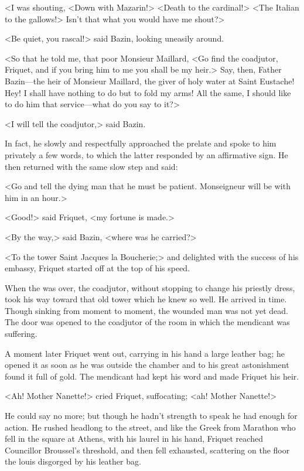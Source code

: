 <I was shouting, <Down with Mazarin!> <Death to the cardinal!> <The Italian to the gallows!> Isn't that what you would have me shout?>

<Be quiet, you rascal!> said Bazin, looking uneasily around.

<So that he told me, that poor Monsieur Maillard, <Go find the coadjutor, Friquet, and if you bring him to me you shall be my heir.> Say, then, Father Bazin—the heir of Monsieur Maillard, the giver of holy water at Saint Eustache! Hey! I shall have nothing to do but to fold my arms! All the same, I should like to do him that service—what do you say to it?>

<I will tell the coadjutor,> said Bazin.

In fact, he slowly and respectfully approached the prelate and spoke to him privately a few words, to which the latter responded by an affirmative sign. He then returned with the same slow step and said:

<Go and tell the dying man that he must be patient. Monseigneur will be with him in an hour.>

<Good!> said Friquet, <my fortune is made.>

<By the way,> said Bazin, <where was he carried?>

<To the tower Saint Jacques la Boucherie;> and delighted with the success of his embassy, Friquet started off at the top of his speed.

When the  was over, the coadjutor, without stopping to change his priestly dress, took his way toward that old tower which he knew so well. He arrived in time. Though sinking from moment to moment, the wounded man was not yet dead. The door was opened to the coadjutor of the room in which the mendicant was suffering.

A moment later Friquet went out, carrying in his hand a large leather bag; he opened it as soon as he was outside the chamber and to his great astonishment found it full of gold. The mendicant had kept his word and made Friquet his heir.

<Ah! Mother Nanette!> cried Friquet, suffocating; <ah! Mother Nanette!>

He could say no more; but though he hadn't strength to speak he had enough for action. He rushed headlong to the street, and like the Greek from Marathon who fell in the square at Athens, with his laurel in his hand, Friquet reached Councillor Broussel's threshold, and then fell exhausted, scattering on the floor the louis disgorged by his leather bag.

